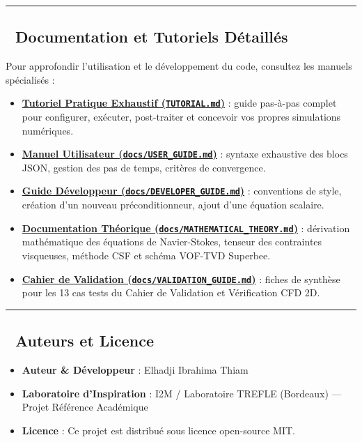 \documentclass[
  french,
]{article}
\providecommand{\tightlist}{%
  \setlength{\itemsep}{0pt}\setlength{\parskip}{0pt}}
\begin{document}
\begin{center}\rule{0.5\linewidth}{0.5pt}\end{center}

\subsection{📖 Documentation et Tutoriels
Détaillés}\label{documentation-et-tutoriels-duxe9tailluxe9s}

Pour approfondir l'utilisation et le développement du code, consultez
les manuels spécialisés :

\begin{itemize}
\tightlist
\item
  \href{TUTORIAL.md}{\textbf{Tutoriel Pratique Exhaustif
  (\texttt{TUTORIAL.md})}} : guide pas-à-pas complet pour configurer,
  exécuter, post-traiter et concevoir vos propres simulations
  numériques.
\item
  \href{docs/USER_GUIDE.md}{\textbf{Manuel Utilisateur
  (\texttt{docs/USER\_GUIDE.md})}} : syntaxe exhaustive des blocs JSON,
  gestion des pas de temps, critères de convergence.
\item
  \href{docs/DEVELOPER_GUIDE.md}{\textbf{Guide Développeur
  (\texttt{docs/DEVELOPER\_GUIDE.md})}} : conventions de style, création
  d'un nouveau préconditionneur, ajout d'une équation scalaire.
\item
  \href{docs/MATHEMATICAL_THEORY.md}{\textbf{Documentation Théorique
  (\texttt{docs/MATHEMATICAL\_THEORY.md})}} : dérivation mathématique
  des équations de Navier-Stokes, tenseur des contraintes visqueuses,
  méthode CSF et schéma VOF-TVD Superbee.
\item
  \href{docs/VALIDATION_GUIDE.md}{\textbf{Cahier de Validation
  (\texttt{docs/VALIDATION\_GUIDE.md})}} : fiches de synthèse pour les
  13 cas tests du Cahier de Validation et Vérification CFD 2D.
\end{itemize}

\begin{center}\rule{0.5\linewidth}{0.5pt}\end{center}

\subsection{👥 Auteurs et Licence}\label{auteurs-et-licence}

\begin{itemize}
\tightlist
\item
  \textbf{Auteur \& Développeur} : Elhadji Ibrahima Thiam
\item
  \textbf{Laboratoire d'Inspiration} : I2M / Laboratoire TREFLE
  (Bordeaux) --- Projet Référence Académique
\item
  \textbf{Licence} : Ce projet est distribué sous licence open-source
  MIT.
\end{itemize}
\end{document}
